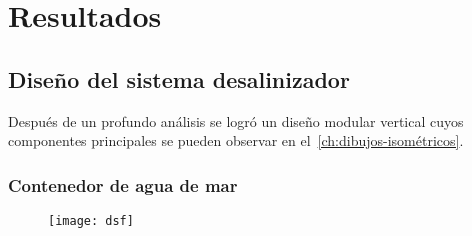 \chapter{Resultados}
	
	\section{Diseño del sistema desalinizador}
		
		Después de un profundo análisis se logró un diseño modular vertical cuyos componentes principales se pueden observar en el~\cref{ch:dibujos-isométricos}.
	
		\subsection{Contenedor de agua de mar}
			
			\begin{figure}
				\centering
				\texttt{[image: dsf]}
			\end{figure}
%		
%		
%		
%		
